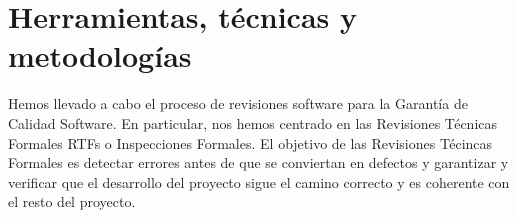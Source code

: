 \documentclass[spanish,a4paper,11pt, twoside]{report}	%
\begin{document}
\chapter{ Herramientas, técnicas y metodologías}
Hemos llevado a cabo el proceso de revisiones software para la Garantía de Calidad Software. En particular, nos hemos centrado en las Revisiones Técnicas Formales RTFs o Inspecciones Formales. El objetivo de las Revisiones Técincas Formales es detectar errores antes de que se conviertan en defectos y garantizar y verificar que el desarrollo del proyecto sigue el camino correcto y es coherente con el resto del proyecto.


\newpage
\mbox{}
\thispagestyle{empty}						%
\newpage



 
\end{document}
